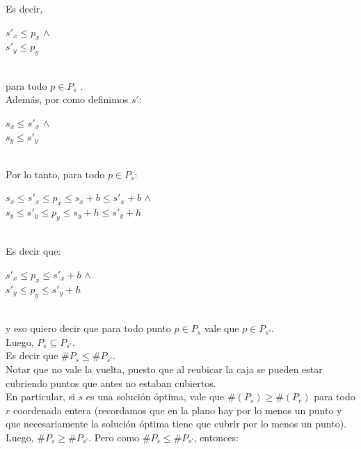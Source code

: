 \indent Es decir,\\ 

\begin{center}
$s'_{x} \leq p_{x}$  $\wedge$ \\
$s'_{y} \leq p_{y}$  \\
\end{center}\\
 
para todo $p \in P_{s}$ .\\

\indent Adem\'as, por como definimos $s'$:\\
\begin{center}
$s_{x} \leq s'_{x} $  $\wedge$ \\
$s_{y} \leq s'_{y}$\\
\end{center}\\

\indent Por lo tanto, para todo $p \in P_{s}$:\\
\begin{center}
$s_{x} \leq s'_{x} \leq p_{x} \leq s_{x} + b  \leq s'_{x} + b$  $\wedge$ \\
$s_{y} \leq s'_{y} \leq p_{y} \leq s_{y} + h  \leq s'_{y} + h$\\
\end{center}\\

\indent Es decir que:\\
\begin{center}
$s'_{x} \leq p_{x} \leq s'_{x} + b$  $\wedge$ \\
$s'_{y} \leq p_{y} \leq s'_{y} + h$\\
\end{center}\\

y eso quiero decir que para todo punto $p \in P_{s} $ vale que $ p \in P_{s'}$. \\
\indent Luego, $P_{s} \subseteq P_{s'}.$\\
\indent Es decir que $\#P_{s} \leq \#P_{s'}$. \\
\indent Notar que no vale la vuelta, puesto que al reubicar la caja se pueden estar cubriendo puntos que antes no estaban cubiertos.\\
									
\indent En particular, si $s$ es una soluci\'on \'optima, vale que $\#(P_{s}) \geq \#(P_{r}) $ para todo $r$ coordenada entera (recordamos que en la plano hay por lo menos un punto y que necesariamente la soluci\'on \'optima tiene que cubrir por lo menos un punto).\\
\indent Luego, $\#P_{s} \geq \#P_{s'}$. Pero como $\#P_{s} \leq \#P_{s'}$, entonces:\\

